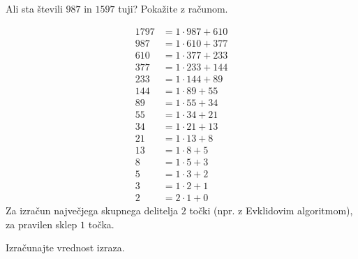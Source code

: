 \documentclass[addpoints]{exam}
\begin{document}
\begin{questions}


        \question[3]
        Ali sta števili $987$ in $1597$ tuji? Pokažite z računom.
        
        \begin{solution}[7cm]
            \begin{align*}
                1797&=1\cdot 987+610\\
                987&=1\cdot 610+377 \\
                610&=1\cdot 377+233 \\
                377&=1\cdot 233+144 \\
                233&=1\cdot 144+89 \\
                144&=1\cdot 89+55 \\
                89&=1\cdot 55+34 \\
                55&=1\cdot 34+21 \\
                34&=1\cdot 21+13 \\
                21&=1\cdot 13+8 \\
                13&=1\cdot 8+5 \\
                8&=1\cdot 5+3 \\
                5&=1\cdot 3+2 \\
                3&=1\cdot 2+1 \\
                2&=2\cdot 1+0
            \end{align*}
            Za izračun največjega skupnega delitelja $2$ točki (npr. z Evklidovim algoritmom), za pravilen sklep $1$ točka.
        \end{solution}
    

    \question
    Izračunajte vrednost izraza.
\end{questions}
\end{document}
